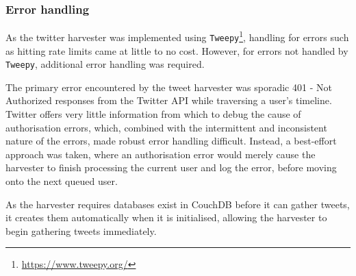 \subsubsection{Error handling}

As the twitter harvester was implemented using \texttt{Tweepy}\footnote{\url{https://www.tweepy.org/}}, handling for errors such as hitting rate limits came at little to no cost. However, for errors not handled by \texttt{Tweepy}, additional error handling was required.

The primary error encountered by the tweet harvester was sporadic 401 - Not Authorized responses from the Twitter API while traversing a user's timeline. Twitter offers very little information from which to debug the cause of authorisation errors, which, combined with the intermittent and inconsistent nature of the errors, made robust error handling difficult. Instead, a best-effort approach was taken, where an authorisation error would merely cause the harvester to finish processing the current user and log the error, before moving onto the next queued user.

As the harvester requires databases exist in CouchDB before it can gather tweets, it creates them automatically when it is initialised, allowing the harvester to begin gathering tweets immediately.


